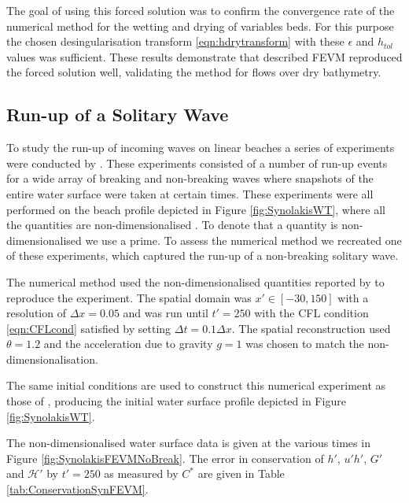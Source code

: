 \documentclass[times]{elsarticle}
\begin{document}
The goal of using this forced solution was to confirm the convergence rate of the numerical method for the wetting and drying of variables beds. For this purpose the chosen desingularisation transform \eqref{eqn:hdrytransform} with these $\epsilon$ and $h_{{tol}}$ values was sufficient. These results demonstrate that described FEVM reproduced the forced solution well, validating the method for flows over dry bathymetry. 

\subsection{Run-up of a Solitary Wave}

To study the run-up of incoming waves on linear beaches a series of experiments were conducted by \citet{Synolakis-1987-523}. These experiments consisted of a number of run-up events for a wide array of breaking and non-breaking waves where snapshots of the entire water surface were taken at certain times. These experiments were all performed on the beach profile depicted in Figure \ref{fig:SynolakisWT}, where all the quantities are non-dimensionalised \cite{Synolakis-1987-523}. To denote that a quantity is non-dimensionalised we use a prime. To assess the numerical method we recreated one of these experiments, which captured the run-up of a non-breaking solitary wave.

The numerical method used the non-dimensionalised quantities reported by \citet{Synolakis-1987-523} to reproduce the experiment. The spatial domain was $x' \in [-30,150]$ with a resolution of $\Delta x = 0.05$ and was run until $t' = 250$ with the CFL condition \eqref{eqn:CFLcond} satisfied by setting $\Delta t = 0.1 \Delta x$. The spatial reconstruction used $\theta = 1.2$ and the acceleration due to gravity $g= 1$ was chosen to match the non-dimensionalisation.

The same initial conditions are used to construct this numerical experiment as those of \citet{Li-2014-169}, producing the initial water surface profile depicted in Figure \ref{fig:SynolakisWT}. 

The non-dimensionalised water surface data is given at the various times in Figure \ref{fig:SynolakisFEVMNoBreak}. The error in conservation of $h'$, $u'h'$, $G'$ and $\mathcal{H}'$ by $t' = 250$ as measured by $C^*$ are given in Table \ref{tab:ConservationSynFEVM}. 
\end{document}
